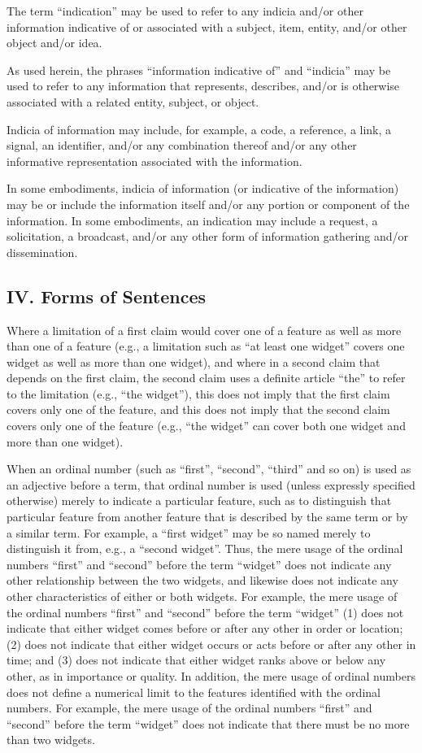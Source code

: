 \documentclass[11pt,a4paper]{article}
\begin{document}
The term “indication” may be used to refer to any indicia and/or other information indicative of or associated with a subject, item, entity, and/or other object and/or idea.

As used herein, the phrases “information indicative of” and “indicia” may be used to refer to any information that represents, describes, and/or is otherwise associated with a related entity, subject, or object.

Indicia of information may include, for example, a code, a reference, a link, a signal, an identifier, and/or any combination thereof and/or any other informative representation associated with the information.

In some embodiments, indicia of information (or indicative of the information) may be or include the information itself and/or any portion or component of the information. In some embodiments, an indication may include a request, a solicitation, a broadcast, and/or any other form of information gathering and/or dissemination.

\subsection{IV. Forms of Sentences}

Where a limitation of a first claim would cover one of a feature as well as more than one of a feature (e.g., a limitation such as “at least one widget” covers one widget as well as more than one widget), and where in a second claim that depends on the first claim, the second claim uses a definite article “the” to refer to the limitation (e.g., “the widget”), this does not imply that the first claim covers only one of the feature, and this does not imply that the second claim covers only one of the feature (e.g., “the widget” can cover both one widget and more than one widget).

When an ordinal number (such as “first”, “second”, “third” and so on) is used as an adjective before a term, that ordinal number is used (unless expressly specified otherwise) merely to indicate a particular feature, such as to distinguish that particular feature from another feature that is described by the same term or by a similar term. For example, a “first widget” may be so named merely to distinguish it from, e.g., a “second widget”. Thus, the mere usage of the ordinal numbers “first” and “second” before the term “widget” does not indicate any other relationship between the two widgets, and likewise does not indicate any other characteristics of either or both widgets. For example, the mere usage of the ordinal numbers “first” and “second” before the term “widget” (1) does not indicate that either widget comes before or after any other in order or location; (2) does not indicate that either widget occurs or acts before or after any other in time; and (3) does not indicate that either widget ranks above or below any other, as in importance or quality. In addition, the mere usage of ordinal numbers does not define a numerical limit to the features identified with the ordinal numbers. For example, the mere usage of the ordinal numbers “first” and “second” before the term “widget” does not indicate that there must be no more than two widgets.
\end{document}
